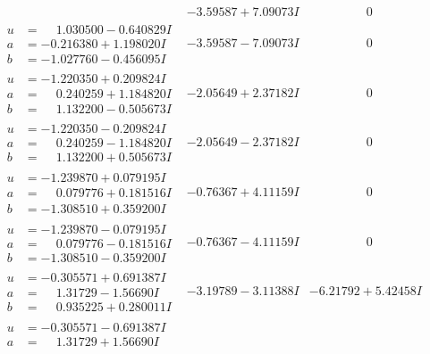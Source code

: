 \documentclass[1p]{elsarticle_modified}
\theoremstyle{definition}
\begin{document}
$$\begin{array}{c|c|c}
 & -3.59587 + 7.09073 I & \phantom{-0.000000 } 0 \\ \hline\begin{aligned}
u &= \phantom{-}1.030500 - 0.640829 I \\
a &= -0.216380 + 1.198020 I \\
b &= -1.027760 - 0.456095 I\end{aligned}
 & -3.59587 - 7.09073 I & \phantom{-0.000000 } 0 \\ \hline\begin{aligned}
u &= -1.220350 + 0.209824 I \\
a &= \phantom{-}0.240259 + 1.184820 I \\
b &= \phantom{-}1.132200 - 0.505673 I\end{aligned}
 & -2.05649 + 2.37182 I & \phantom{-0.000000 } 0 \\ \hline\begin{aligned}
u &= -1.220350 - 0.209824 I \\
a &= \phantom{-}0.240259 - 1.184820 I \\
b &= \phantom{-}1.132200 + 0.505673 I\end{aligned}
 & -2.05649 - 2.37182 I & \phantom{-0.000000 } 0 \\ \hline\begin{aligned}
u &= -1.239870 + 0.079195 I \\
a &= \phantom{-}0.079776 + 0.181516 I \\
b &= -1.308510 + 0.359200 I\end{aligned}
 & -0.76367 + 4.11159 I & \phantom{-0.000000 } 0 \\ \hline\begin{aligned}
u &= -1.239870 - 0.079195 I \\
a &= \phantom{-}0.079776 - 0.181516 I \\
b &= -1.308510 - 0.359200 I\end{aligned}
 & -0.76367 - 4.11159 I & \phantom{-0.000000 } 0 \\ \hline\begin{aligned}
u &= -0.305571 + 0.691387 I \\
a &= \phantom{-}1.31729 - 1.56690 I \\
b &= \phantom{-}0.935225 + 0.280011 I\end{aligned}
 & -3.19789 - 3.11388 I & -6.21792 + 5.42458 I \\ \hline\begin{aligned}
u &= -0.305571 - 0.691387 I \\
a &= \phantom{-}1.31729 + 1.56690 I \\

\end{aligned}
\end{array}$$
\end{document}
